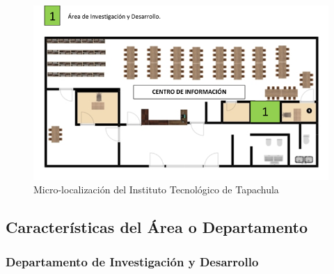 \begin{figure}[!hb]
\centering
\includegraphics[scale=0.8]{sources/microlocalizacion.png}
\caption{Micro-localización del Instituto Tecnológico de Tapachula}\label{fig:microloc}
\end{figure}

\subsection*{Características del Área o Departamento}

\subsubsection*{Departamento de Investigación y Desarrollo}

